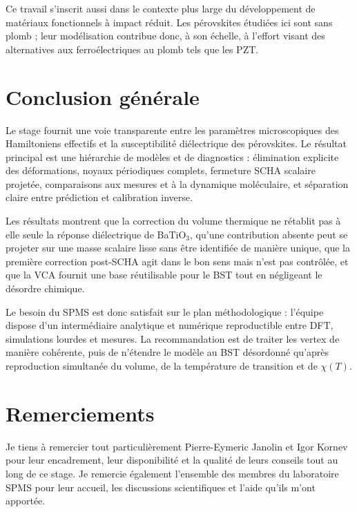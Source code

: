 \documentclass{rapportCS}
\begin{document}
Ce travail s'inscrit aussi dans le contexte plus large du développement de
matériaux fonctionnels à impact réduit. Les pérovskites étudiées ici sont sans
plomb ; leur modélisation contribue donc, à son échelle, à l'effort visant des
alternatives aux ferroélectriques au plomb tels que les PZT.

\section{Conclusion générale}
\label{sec:general_conclusion}

Le stage fournit une voie transparente entre les paramètres microscopiques des
Hamiltoniens effectifs et la susceptibilité diélectrique des pérovskites. Le
résultat principal est une hiérarchie
de modèles et de diagnostics : élimination explicite des déformations,
noyaux périodiques complets, fermeture SCHA scalaire projetée,
comparaisons aux
mesures et à la dynamique moléculaire, et séparation claire entre prédiction et
calibration inverse.

Les résultats montrent que la correction du volume thermique ne rétablit pas à
elle seule la réponse diélectrique de BaTiO$_3$, qu'une contribution absente peut
se projeter sur une masse scalaire lisse sans être identifiée de manière unique,
que la première correction post-SCHA agit dans le bon sens mais n'est pas
contrôlée, et que la VCA fournit une base réutilisable pour le BST tout en
négligeant le désordre chimique.

Le besoin du SPMS est donc satisfait sur le plan méthodologique : l'équipe
dispose d'un intermédiaire analytique et numérique reproductible entre DFT,
simulations lourdes et mesures. La recommandation est de traiter les vertex de
manière cohérente, puis de n'étendre le modèle au BST désordonné qu'après reproduction
simultanée du volume, de la température de transition et de $\chi(T)$.

\section*{Remerciements}

Je tiens à remercier tout particulièrement Pierre-Eymeric Janolin et Igor
Kornev pour leur encadrement, leur disponibilité et la qualité de leurs conseils
tout au long de ce stage. Je remercie également l'ensemble des membres du
laboratoire SPMS pour leur accueil, les discussions scientifiques et l'aide
qu'ils m'ont apportée.
\end{document}
